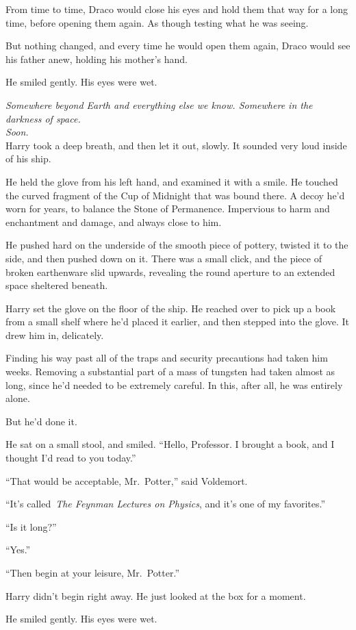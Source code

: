 From time to time, Draco would close his eyes and hold them that way for
a long time, before opening them again. As though testing what he was
seeing.

But nothing changed, and every time he would open them again, Draco
would see his father anew, holding his mother's hand.

He smiled gently. His eyes were wet.

\mybreak

\emph{Somewhere beyond Earth and everything else we know. Somewhere in
the darkness of space.}\\
\emph{Soon.}\\

Harry took a deep breath, and then let it out, slowly. It sounded very
loud inside of his ship.

He held the glove from his left hand, and examined it with a smile. He
touched the curved fragment of the Cup of Midnight that was bound there.
A decoy he'd worn for years, to balance the Stone of Permanence.
Impervious to harm and enchantment and damage, and always close to him.

He pushed hard on the underside of the smooth piece of pottery, twisted
it to the side, and then pushed down on it. There was a small click, and
the piece of broken earthenware slid upwards, revealing the round
aperture to an extended space sheltered beneath.

Harry set the glove on the floor of the ship. He reached over to pick up
a book from a small shelf where he'd placed it earlier, and then stepped
into the glove. It drew him in, delicately.

Finding his way past all of the traps and security precautions had taken
him weeks. Removing a substantial part of a mass of tungsten had taken
almost as long, since he'd needed to be extremely careful. In this,
after all, he was entirely alone.

But he'd done it.

He sat on a small stool, and smiled. ``Hello, Professor. I brought a
book, and I thought I'd read to you today.''

``That would be acceptable, Mr.~Potter,'' said Voldemort.

``It's called~\emph{The Feynman Lectures on Physics}, and it's one of my
favorites.''

``Is it long?''

``Yes.''

``Then begin at your leisure, Mr.~Potter.''

Harry didn't begin right away. He just looked at the box for a moment.

He smiled gently. His eyes were wet.

\Stopbonus
